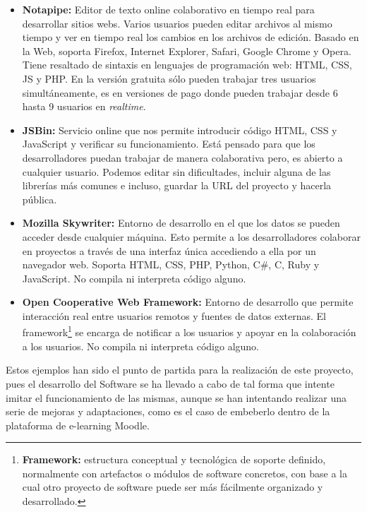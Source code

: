 \begin{itemize}
	\item \textbf{Notapipe\cite{notapipe}:} Editor de texto online colaborativo en tiempo real para desarrollar sitios webs. Varios usuarios pueden editar archivos al mismo tiempo y ver en tiempo real los cambios en los archivos de edición. Basado en la Web, soporta Firefox, Internet Explorer, Safari, Google Chrome y Opera. Tiene resaltado de sintaxis en lenguajes de programación web: HTML, CSS, JS y PHP. En la versión gratuita sólo pueden trabajar tres usuarios simultáneamente, es en versiones de pago donde pueden trabajar desde 6 hasta 9 usuarios en \emph{realtime}.
	
	\item \textbf{JSBin\cite{jsbin}:} Servicio online que nos permite introducir código HTML, CSS y JavaScript y verificar su funcionamiento. Está pensado para que los desarrolladores puedan trabajar de manera colaborativa pero, es abierto a cualquier usuario. Podemos editar sin dificultades, incluir alguna de las librerías más comunes e incluso, guardar la URL del proyecto y hacerla pública.
	
	\item \textbf{Mozilla Skywriter\cite{skywriter}:} Entorno de desarrollo en el que los datos se pueden acceder desde cualquier máquina. Esto permite a los desarrolladores colaborar en proyectos a través de una interfaz única accediendo a ella por un navegador web. Soporta HTML, CSS, PHP, Python, C\#, C, Ruby y JavaScript. No compila ni interpreta código alguno.
	
	\item \textbf{Open Cooperative Web Framework\cite{opencoweb}:} Entorno de desarrollo que permite interacción real entre usuarios remotos y fuentes de datos externas. El framework\footnote{\textbf{Framework: }  estructura conceptual y tecnológica de soporte definido, normalmente con artefactos o módulos de software concretos, con base a la cual otro proyecto de software puede ser más fácilmente organizado y desarrollado.} se encarga de notificar a los usuarios y apoyar en la colaboración a los usuarios. No compila ni interpreta código alguno.
	
\end{itemize}

Estos ejemplos han sido el punto de partida para la realización de este proyecto, pues el desarrollo del Software se ha llevado a cabo de tal forma que intente imitar el funcionamiento de las mismas, aunque se han intentando realizar una serie de mejoras y adaptaciones, como es el caso de embeberlo dentro de la plataforma de e-learning Moodle.

